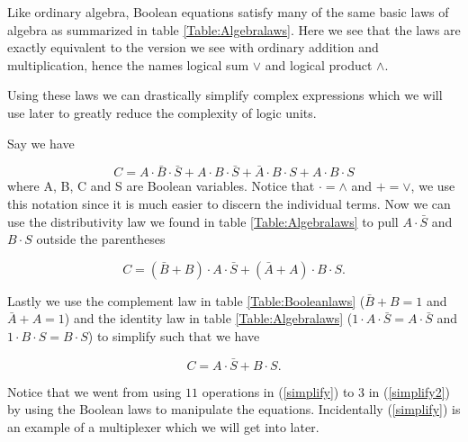             Like ordinary algebra, Boolean equations satisfy many of the same basic laws of algebra as summarized in table \ref{Table:Algebralaws}. Here we see that the laws are exactly equivalent to the version we see with ordinary addition and multiplication, hence the names logical sum $\vee$ and logical product $\wedge$.
            
            Using these laws we can drastically simplify complex expressions which we will use later to greatly reduce the complexity of logic units. 
            
            Say we have 
            
            \begin{equation}
               \label{simplify}
                C = A \cdot \bar{B} \cdot \bar{S} + A \cdot B \cdot \bar{S} + \bar{A} \cdot B \cdot S
                  + A \cdot B \cdot S
            \end{equation}
            where A, B, C and S are Boolean variables. Notice that $\cdot = \wedge$ and $+ = \vee$, we use this notation since it is much easier to discern the individual terms. Now we can use the distributivity law we found in table \ref{Table:Algebralaws} to pull $A\cdot \bar{S}$ and $B \cdot S$ outside the parentheses
            
            \begin{equation}
                C = (\bar{B} + B) \cdot A\cdot \bar{S} + (\bar{A} + A)\cdot B\cdot S.
            \end{equation}
            
            Lastly we use the complement law in table \ref{Table:Booleanlaws} ($\bar{B} + B = 1$ and $\bar{A} + A = 1$) and the identity law in table \ref{Table:Algebralaws} ($1 \cdot A\cdot \bar{S} = A\cdot \bar{S}$ and $1 \cdot B\cdot S = B\cdot S$) to simplify such that we have
            
            \begin{equation}
                \label{simplify2}
                C = A\cdot \bar{S} + B\cdot S.
            \end{equation}
            
            Notice that we went from using $11$ operations in (\ref{simplify}) to $3$ in (\ref{simplify2}) by using the Boolean laws to manipulate the equations. Incidentally (\ref{simplify}) is an example of a multiplexer which we will get into later.
              
